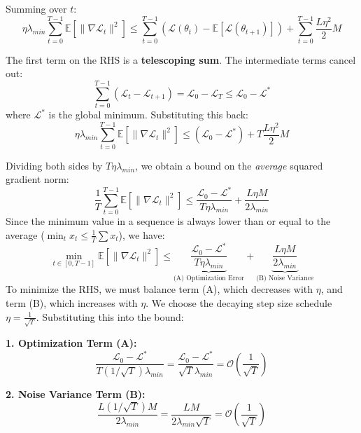 \documentclass{article}
\theoremstyle{plain}
\theoremstyle{definition}
\theoremstyle{remark}
\begin{document}
Summing over $t$:
\begin{equation}
    \eta \lambda_{min} \sum_{t=0}^{T-1} \mathbb{E}[\|\nabla \mathcal{L}_t\|^2] \le \sum_{t=0}^{T-1} \left( \mathcal{L}(\theta_t) - \mathbb{E}[\mathcal{L}(\theta_{t+1})] \right) + \sum_{t=0}^{T-1} \frac{L \eta^2}{2} M
\end{equation}

The first term on the RHS is a \textbf{telescoping sum}. The intermediate terms cancel out:
\begin{equation}
    \sum_{t=0}^{T-1} (\mathcal{L}_t - \mathcal{L}_{t+1}) = \mathcal{L}_0 - \mathcal{L}_T \le \mathcal{L}_0 - \mathcal{L}^*
\end{equation}
where $\mathcal{L}^*$ is the global minimum. Substituting this back:
\begin{equation}
    \eta \lambda_{min} \sum_{t=0}^{T-1} \mathbb{E}[\|\nabla \mathcal{L}_t\|^2] \le (\mathcal{L}_0 - \mathcal{L}^*) + T \frac{L \eta^2}{2} M
\end{equation}

Dividing both sides by $T \eta \lambda_{min}$, we obtain a bound on the \textit{average} squared gradient norm:
\begin{equation}
    \frac{1}{T} \sum_{t=0}^{T-1} \mathbb{E}[\|\nabla \mathcal{L}_t\|^2] \le \frac{\mathcal{L}_0 - \mathcal{L}^*}{T \eta \lambda_{min}} + \frac{L \eta M}{2 \lambda_{min}}
\end{equation}
Since the minimum value in a sequence is always lower than or equal to the average ($\min_t x_t \le \frac{1}{T}\sum x_t$), we have:
\begin{equation}
    \min_{t \in [0, T-1]} \mathbb{E}[\|\nabla \mathcal{L}_t\|^2] \le \underbrace{\frac{\mathcal{L}_0 - \mathcal{L}^*}{T \eta \lambda_{min}}}_{\text{(A) Optimization Error}} + \underbrace{\frac{L \eta M}{2 \lambda_{min}}}_{\text{(B) Noise Variance}}
\end{equation}
To minimize the RHS, we must balance term (A), which decreases with $\eta$, and term (B), which increases with $\eta$. We choose the decaying step size schedule $\eta = \frac{1}{\sqrt{T}}$. Substituting this into the bound:

\textbf{1. Optimization Term (A):}
\begin{equation}
    \frac{\mathcal{L}_0 - \mathcal{L}^*}{T (1/\sqrt{T}) \lambda_{min}} = \frac{\mathcal{L}_0 - \mathcal{L}^*}{\sqrt{T} \lambda_{min}} = \mathcal{O}\left(\frac{1}{\sqrt{T}}\right)
\end{equation}

\textbf{2. Noise Variance Term (B):}
\begin{equation}
    \frac{L (1/\sqrt{T}) M}{2 \lambda_{min}} = \frac{L M}{2 \lambda_{min} \sqrt{T}} = \mathcal{O}\left(\frac{1}{\sqrt{T}}\right)
\end{equation}
\end{document}
